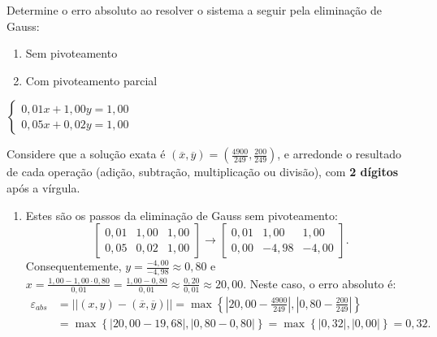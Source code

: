 \documentclass[12pt,a4paper]{article}
\begin{document}
\begin{ExerciseList}
\Exercise[title={2,5}]
Determine o erro absoluto ao resolver o sistema a seguir pela eliminação de Gauss:
\begin{multicols}{2}
\begin{enumerate}
\item Sem pivoteamento
\item Com pivoteamento parcial
\end{enumerate}
$\begin{cases}
0,01x+1,00y=1,00\\
0,05x+0,02y=1,00
\end{cases}$
\end{multicols}
Considere que a solução exata é $(\overline{x},\overline{y}) = (\frac{4900}{249}, \frac{200}{249})$, e arredonde o resultado de cada operação (adição, subtração, multiplicação ou divisão), com \textbf{2 dígitos} após a vírgula.
\Answer
\begin{enumerate}
\item Estes são os passos da eliminação de Gauss sem pivoteamento:
\[
\begin{bmatrix}
0,01 & 1,00 & 1,00\\
0,05 & 0,02 & 1,00
\end{bmatrix}
\rightarrow
\begin{bmatrix}
0,01 &  1,00 & 1,00\\
0,00 & -4,98 & -4,00
\end{bmatrix}.
\]
Consequentemente, $y = \frac{-4,00}{-4,98} \approx 0,80$ e
$x = \frac{1,00 - 1,00 \cdot 0,80}{0,01}
= \frac{1,00 - 0,80}{0,01}
\approx \frac{0,20}{0,01}\approx 20,00$. Neste caso, o erro absoluto é:
\begin{align*}
\varepsilon_{abs}
& = ||(x,y) - (\overline{x},\overline{y})||
  = \max \left\{ \left|20,00 - \frac{4900}{249}\right|, \left|0,80 - \frac{200}{249}\right| \right\}\\
& = \max \left\{ \left|20,00 - 19,68\right|, \left|0,80 - 0,80\right| \right\}
  = \max \left\{ \left|0,32\right|, \left|0,00\right| \right\}
  = 0,32.
\end{align*}


\end{enumerate}
\end{ExerciseList}
\end{document}
